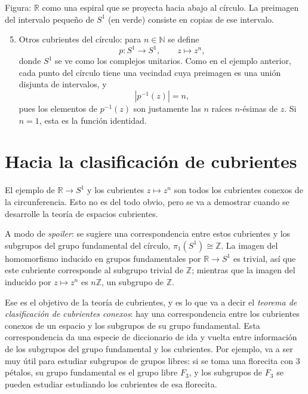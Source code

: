 \documentclass[11pt]{article}
\begin{document}
\noindent Figura: $\mathbb{R}$ como una espiral que se proyecta hacia abajo al círculo. La preimagen del intervalo pequeño de $S^1$ (en verde) consiste en copias de ese intervalo.

\begin{enumerate}\setcounter{enumi}{4}
  \item Otros cubrientes del círculo: para $n\in\mathbb{N}$ se define
  \[
    p\colon S^1\to S^1,\qquad z\mapsto z^n,
  \]
  donde $S^1$ se ve como los complejos unitarios. Como en el ejemplo anterior, cada punto del círculo tiene una vecindad cuya preimagen es una unión disjunta de intervalos, y
  \[
    |p^{-1}(z)|=n,
  \]
  pues los elementos de $p^{-1}(z)$ son justamente las $n$ raíces $n$-ésimas de $z$. Si $n=1$, esta es la función identidad.
\end{enumerate}

\section*{Hacia la clasificación de cubrientes}

El ejemplo de $\mathbb{R}\to S^1$ y los cubrientes $z\mapsto z^n$ son todos los cubrientes conexos de la circunferencia. Esto no es del todo obvio, pero se va a demostrar cuando se desarrolle la teoría de espacios cubrientes.

A modo de \emph{spoiler}: se sugiere una correspondencia entre estos cubrientes y los subgrupos del grupo fundamental del círculo, $\pi_1(S^1)\cong\mathbb{Z}$. La imagen del homomorfismo inducido en grupos fundamentales por $\mathbb{R}\to S^1$ es trivial, así que este cubriente corresponde al subgrupo trivial de $\mathbb{Z}$; mientras que la imagen del inducido por $z\mapsto z^n$ es $n\mathbb{Z}$, un subgrupo de $\mathbb{Z}$.

Ese es el objetivo de la teoría de cubrientes, y es lo que va a decir el \emph{teorema de clasificación de cubrientes conexos}: hay una correspondencia entre los cubrientes conexos de un espacio y los subgrupos de su grupo fundamental. Esta correspondencia da una especie de diccionario de ida y vuelta entre información de los subgrupos del grupo fundamental y los cubrientes. Por ejemplo, va a ser muy útil para estudiar subgrupos de grupos libres: si se toma una \guillemotleft{}florecita\guillemotright{} con $3$ pétalos, su grupo fundamental es el grupo libre $F_3$, y los subgrupos de $F_3$ se pueden estudiar estudiando los cubrientes de esa florecita.
\end{document}
